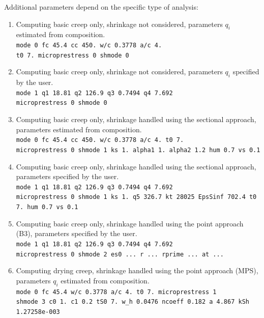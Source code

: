 \documentclass[a4paper]{article}
\begin{document}
Additional parameters
depend on the specific type of analysis:
\begin{enumerate}
\item
Computing basic creep only, shrinkage not considered,
parameters $q_i$ estimated from composition.\\
{\tt mode 0 fc 45.4 cc 450.  w/c 0.3778 a/c 4.\\ t0 7. microprestress 0 shmode 0} 
\item 
Computing  basic creep only, shrinkage not considered,
parameters $q_i$ specified by the user.\\
{\tt mode 1 q1 18.81 q2 126.9 q3 0.7494 q4 7.692\\ microprestress 0 shmode 0} 
\item 
Computing  basic creep only, shrinkage handled using the sectional approach,
parameters estimated from composition.\\
{\tt mode 0 fc 45.4 cc 450. w/c 0.3778 a/c 4. t0 7.\\ microprestress 0 shmode 1 ks 1. alpha1 1. alpha2 1.2 hum 0.7 vs 0.1}
\item 
Computing  basic creep only, shrinkage handled using the sectional approach,
parameters specified by the user.\\
{\tt mode 1 q1 18.81 q2 126.9 q3 0.7494 q4 7.692\\
 microprestress 0 shmode 1 ks 1. q5 326.7 kt  28025 EpsSinf 702.4 t0 7. hum 0.7 vs 0.1}
\item 
Computing  basic creep only, shrinkage handled using the point approach (B3),
parameters specified by the user.\\
{\tt mode 1 q1 18.81 q2 126.9 q3 0.7494 q4 7.692\\ 
microprestress 0 shmode 2 es0 ... r ... rprime ... at ...}
\item
Computing drying creep, shrinkage handled using the point approach (MPS),
parameters $q_i$ estimated from composition.\\
{\tt mode 0 fc 45.4 w/c 0.3778 a/c 4. t0 7. microprestress 1 \\
shmode 3 c0 1. c1 0.2 tS0 7. w\_h 0.0476 ncoeff 0.182 a 4.867  kSh 1.27258e-003}
\end{enumerate}


\end{document}
